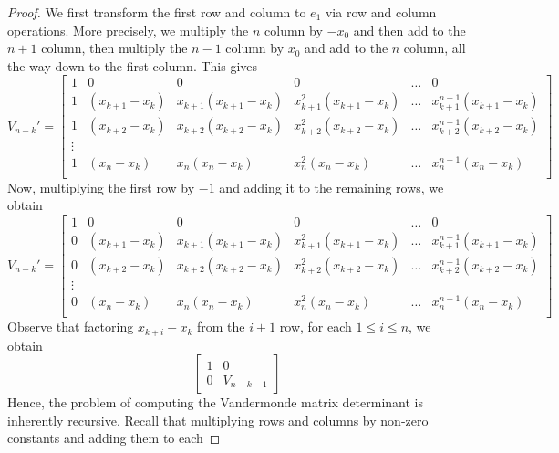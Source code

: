 \documentclass[12pt]{article}
\theoremstyle{plain}
\theoremstyle{definition}
\theoremstyle{remark}
\numberwithin{equation}{section}  %
\begin{document}
	\begin{proof}
		We first transform the first row and column to $e_1$ 
		via row and column operations. More precisely, we multiply the $n$ column by $-x_0$ and then
		add to the $n+1$ column, then multiply the $n-1$ column by $x_0$ and add
		to the $n$ column, all the way down to the first column. This gives
		\begin{equation*}
			V_{n-k}' = \begin{bmatrix}
				1 & 0 & 0 & 0 & \ldots  & 0 \\
				1 & (x_{k+1} - x_k) & x_{k+1}(x_{k+1} - x_k) & x_{k+1}^2(x_{k+1} - x_k) & \ldots & x_{k+1}^{n-1}(x_{k+1} - x_k) \\
				1 & (x_{k+2} - x_k) & x_{k+2}(x_{k+2} - x_k) & x_{k+2}^2(x_{k+2} - x_k) & \ldots & x_{k+2}^{n-1}(x_{k+2} - x_k) \\
				\vdots \\
				1 & (x_n - x_k) & x_n(x_n - x_k) & x_n^2(x_n - x_k) & \ldots & x_n^{n-1}(x_n - x_k) \\
			\end{bmatrix}
		\end{equation*}
		Now, multiplying the first row by $-1$ and adding it to the remaining rows,
		we obtain
		\begin{equation*}
			V_{n-k}' = \begin{bmatrix}
				1 & 0 & 0 & 0 & \ldots & 0 \\
				0 & (x_{k+1} - x_k) & x_{k+1}(x_{k+1} - x_k) & x_{k+1}^2(x_{k+1} - x_k) & \ldots & x_{k+1}^{n-1}(x_{k+1} - x_k) \\
				0 & (x_{k+2} - x_k) & x_{k+2}(x_{k+2} - x_k) & x_{k+2}^2(x_{k+2} - x_k) & \ldots & x_{k+2}^{n-1}(x_{k+2} - x_k) \\
				\vdots \\
				0 & (x_n - x_k) & x_n(x_n - x_k) & x_n^2(x_n - x_k) & \ldots & x_n^{n-1}(x_n - x_k) \\
			\end{bmatrix}
		\end{equation*}
		Observe that factoring $x_{k+i} -x_k$ from the $i+1$ row, for each $1 \le i \le n$, we obtain
		\begin{equation*}
			\begin{bmatrix}
				1 & 0 \\
				0 & V_{n-k-1}
			\end{bmatrix}
		\end{equation*}
		Hence, the problem of computing the Vandermonde matrix determinant is inherently
		recursive. Recall that multiplying rows and columns by non-zero constants and adding them to each

\end{proof}
\end{document}
